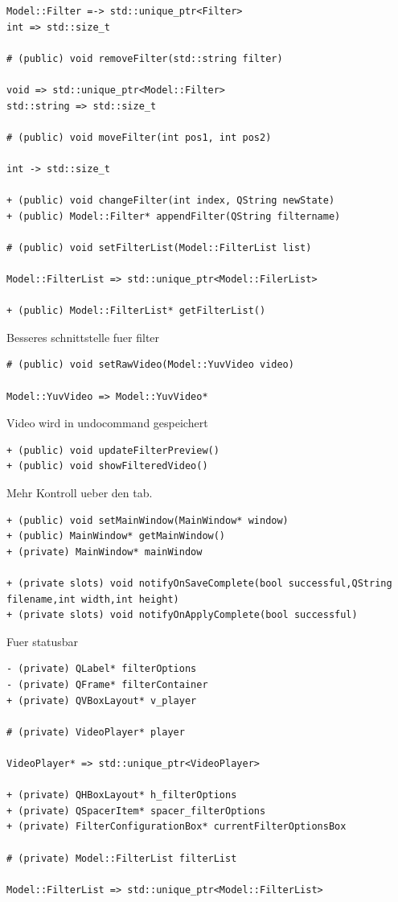 \documentclass{scrartcl}
\begin{document}
{\begin{verbatim}
Model::Filter =-> std::unique_ptr<Filter>
int => std::size_t

# (public) void removeFilter(std::string filter)

void => std::unique_ptr<Model::Filter>
std::string => std::size_t

# (public) void moveFilter(int pos1, int pos2)

int -> std::size_t

+ (public) void changeFilter(int index, QString newState)
+ (public) Model::Filter* appendFilter(QString filtername)

# (public) void setFilterList(Model::FilterList list)

Model::FilterList => std::unique_ptr<Model::FilerList>

+ (public) Model::FilterList* getFilterList()
\end{verbatim}
Besseres schnittstelle fuer filter
\begin{verbatim}
# (public) void setRawVideo(Model::YuvVideo video)

Model::YuvVideo => Model::YuvVideo*
\end{verbatim}
Video wird in undocommand gespeichert
\begin{verbatim}
+ (public) void updateFilterPreview()
+ (public) void showFilteredVideo()
\end{verbatim}
Mehr Kontroll ueber den tab.
\begin{verbatim}
+ (public) void setMainWindow(MainWindow* window)
+ (public) MainWindow* getMainWindow()
+ (private) MainWindow* mainWindow

+ (private slots) void notifyOnSaveComplete(bool successful,QString filename,int width,int height)
+ (private slots) void notifyOnApplyComplete(bool successful)
\end{verbatim}
Fuer statusbar
\begin{verbatim}
- (private) QLabel* filterOptions
- (private) QFrame* filterContainer
+ (private) QVBoxLayout* v_player

# (private) VideoPlayer* player

VideoPlayer* => std::unique_ptr<VideoPlayer>

+ (private) QHBoxLayout* h_filterOptions
+ (private) QSpacerItem* spacer_filterOptions
+ (private) FilterConfigurationBox* currentFilterOptionsBox
	
# (private) Model::FilterList filterList
	
Model::FilterList => std::unique_ptr<Model::FilterList>
	

\end{verbatim}}
\end{document}

